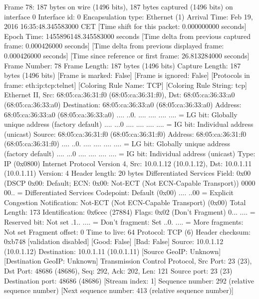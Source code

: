 Frame 78: 187 bytes on wire (1496 bits), 187 bytes captured (1496 bits) on interface 0
    Interface id: 0
    Encapsulation type: Ethernet (1)
    Arrival Time: Feb 19, 2016 16:35:48.345583000 CET
    [Time shift for this packet: 0.000000000 seconds]
    Epoch Time: 1455896148.345583000 seconds
    [Time delta from previous captured frame: 0.000426000 seconds]
    [Time delta from previous displayed frame: 0.000426000 seconds]
    [Time since reference or first frame: 26.813284000 seconds]
    Frame Number: 78
    Frame Length: 187 bytes (1496 bits)
    Capture Length: 187 bytes (1496 bits)
    [Frame is marked: False]
    [Frame is ignored: False]
    [Protocols in frame: eth:ip:tcp:telnet]
    [Coloring Rule Name: TCP]
    [Coloring Rule String: tcp]
Ethernet II, Src: 68:05:ca:36:31:f0 (68:05:ca:36:31:f0), Dst: 68:05:ca:36:33:a0 (68:05:ca:36:33:a0)
    Destination: 68:05:ca:36:33:a0 (68:05:ca:36:33:a0)
        Address: 68:05:ca:36:33:a0 (68:05:ca:36:33:a0)
        .... ..0. .... .... .... .... = LG bit: Globally unique address (factory default)
        .... ...0 .... .... .... .... = IG bit: Individual address (unicast)
    Source: 68:05:ca:36:31:f0 (68:05:ca:36:31:f0)
        Address: 68:05:ca:36:31:f0 (68:05:ca:36:31:f0)
        .... ..0. .... .... .... .... = LG bit: Globally unique address (factory default)
        .... ...0 .... .... .... .... = IG bit: Individual address (unicast)
    Type: IP (0x0800)
Internet Protocol Version 4, Src: 10.0.1.12 (10.0.1.12), Dst: 10.0.1.11 (10.0.1.11)
    Version: 4
    Header length: 20 bytes
    Differentiated Services Field: 0x00 (DSCP 0x00: Default; ECN: 0x00: Not-ECT (Not ECN-Capable Transport))
        0000 00.. = Differentiated Services Codepoint: Default (0x00)
        .... ..00 = Explicit Congestion Notification: Not-ECT (Not ECN-Capable Transport) (0x00)
    Total Length: 173
    Identification: 0x6cec (27884)
    Flags: 0x02 (Don't Fragment)
        0... .... = Reserved bit: Not set
        .1.. .... = Don't fragment: Set
        ..0. .... = More fragments: Not set
    Fragment offset: 0
    Time to live: 64
    Protocol: TCP (6)
    Header checksum: 0xb748 [validation disabled]
        [Good: False]
        [Bad: False]
    Source: 10.0.1.12 (10.0.1.12)
    Destination: 10.0.1.11 (10.0.1.11)
    [Source GeoIP: Unknown]
    [Destination GeoIP: Unknown]
Transmission Control Protocol, Src Port: 23 (23), Dst Port: 48686 (48686), Seq: 292, Ack: 202, Len: 121
    Source port: 23 (23)
    Destination port: 48686 (48686)
    [Stream index: 1]
    Sequence number: 292    (relative sequence number)
    [Next sequence number: 413    (relative sequence number)]
